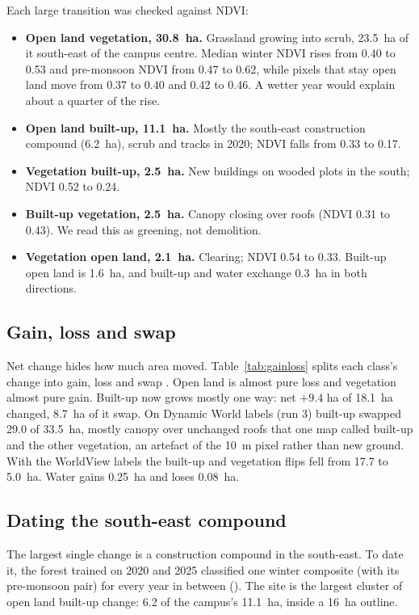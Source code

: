 \documentclass[11pt,a4paper]{article}
\makeatletter
\newcommand{\ra}{\ifdefequal{\f@series}{\bfdefault}{{\boldmath$\rightarrow$}}{$\rightarrow$}}
\makeatother
\begin{document}
Each large transition was checked against NDVI:
\begin{itemize}
  \item \textbf{Open land \ra{} vegetation, 30.8~ha.} Grassland growing into scrub, 23.5~ha of it south-east of the campus centre. Median winter NDVI rises from 0.40 to 0.53 and pre-monsoon NDVI from 0.47 to 0.62, while pixels that stay open land move from 0.37 to 0.40 and 0.42 to 0.46. A wetter year would explain about a quarter of the rise.
  \item \textbf{Open land \ra{} built-up, 11.1~ha.} Mostly the south-east construction compound (6.2~ha), scrub and tracks in 2020; NDVI falls from 0.33 to 0.17.
  \item \textbf{Vegetation \ra{} built-up, 2.5~ha.} New buildings on wooded plots in the south; NDVI 0.52 to 0.24.
  \item \textbf{Built-up \ra{} vegetation, 2.5~ha.} Canopy closing over roofs (NDVI 0.31 to 0.43). We read this as greening, not demolition.
  \item \textbf{Vegetation \ra{} open land, 2.1~ha.} Clearing; NDVI 0.54 to 0.33. Built-up \ra{} open land is 1.6~ha, and built-up and water exchange 0.3~ha in both directions.
\end{itemize}

\subsection{Gain, loss and swap}
Net change hides how much area moved. Table~\ref{tab:gainloss} splits each class's change into gain, loss and swap \citep{pontius2004}. Open land is almost pure loss and vegetation almost pure gain. Built-up now grows mostly one way: net $+9.4$ ha of 18.1~ha changed, 8.7~ha of it swap. On Dynamic World labels (run 3) built-up swapped 29.0 of 33.5~ha, mostly canopy over unchanged roofs that one map called built-up and the other vegetation, an artefact of the 10~m pixel rather than new ground. With the WorldView labels the built-up and vegetation flips fell from 17.7 to 5.0~ha. Water gains 0.25~ha and loses 0.08~ha.

\begin{table}[htbp]
\centering
\caption{Gross gain, loss, net change and swap, ha. Swap $= 2\min(\text{gain},\text{loss})$.}
\label{tab:gainloss}
{\small}
\end{table}

\subsection{Dating the south-east compound}
The largest single change is a construction compound in the south-east. To date it, the forest trained on 2020 and 2025 classified one winter composite (with its pre-monsoon pair) for every year in between (). The site is the largest cluster of open land \ra{} built-up change: 6.2 of the campus's 11.1~ha, inside a 16~ha outline.
\end{document}
